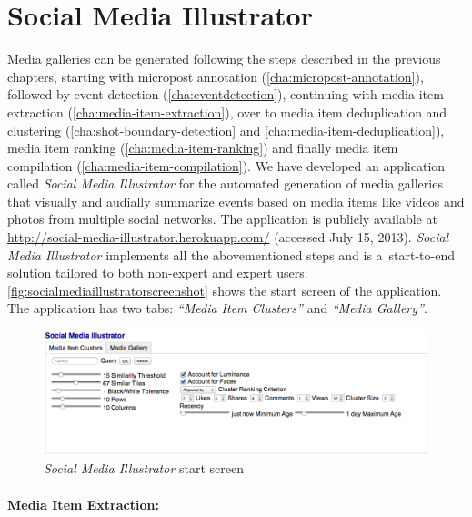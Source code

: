 \section{Social Media Illustrator}
\label{sec:socialmediaillustrator}

Media galleries can be generated following the steps described in the previous chapters,
starting with micropost annotation (\autoref{cha:micropost-annotation}),
followed by event detection (\autoref{cha:eventdetection}),
continuing with media item extraction
(\autoref{cha:media-item-extraction}),
over to media item deduplication and clustering
(\autoref{cha:shot-boundary-detection} and
\autoref{cha:media-item-deduplication}),
media item ranking (\autoref{cha:media-item-ranking}) and
finally media item compilation (\autoref{cha:media-item-compilation}).
We have developed an application called \emph{Social Media Illustrator}
for the automated generation of
media galleries that visually and audially summarize events
based on media items like videos and photos from multiple social networks.
The application is publicly available at
\url{http://social-media-illustrator.herokuapp.com/} (accessed July 15, 2013).
\emph{Social Media Illustrator} implements all the abovementioned steps
and is a~start-to-end solution tailored to both
non-expert and expert users.
\autoref{fig:socialmediaillustratorscreenshot}
shows the start screen of the application.
The application has two tabs: \emph{``Media Item Clusters''} and \emph{``Media Gallery''}.

\begin{figure}[!ht]
  \centering
  \includegraphics[width=1\columnwidth]{socialmediaillustrator.png}
  \caption{\emph{Social Media Illustrator} start screen}
  \label{fig:socialmediaillustratorscreenshot}
\end{figure}

\paragraph{Media Item Extraction:}

